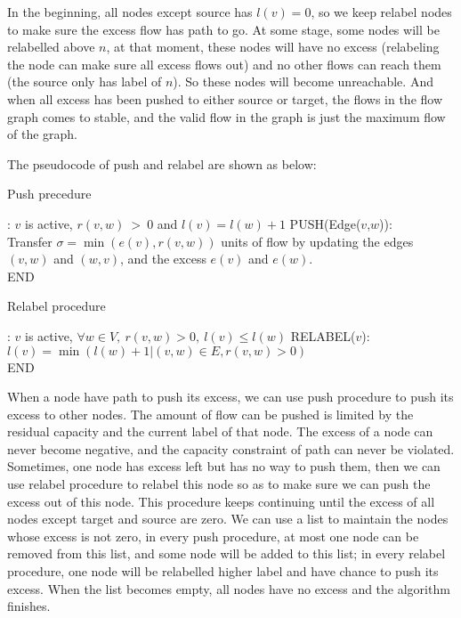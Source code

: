 \documentclass[twocolumn,9pt]{extarticle}
\begin{document}
In the beginning, all nodes except source has $l(v)=0$, so we keep relabel nodes to make sure the excess flow has path to go. At some stage, some nodes will be relabelled above $n$, at that moment, these nodes will have no excess (relabeling the node can make sure all excess flows out) and no other flows can reach them (the source only has label of $n$). So these nodes will become unreachable. And when all excess has been pushed to either source or target, the flows in the flow graph comes to stable, and the valid flow in the graph is just the maximum flow of the graph.

The pseudocode of push and relabel are shown as below:
\begin{algorithm}
\caption{Push precedure}
	\begin{algorithmic}[1]
		\Require: $v$ is active, $r(v,w)\ >\ 0$ and $l(v)=l(w)+1$
		PUSH(Edge($v$,$w$)):\\
			Transfer $\sigma=\min(e(v),r(v,w))$ units of flow by updating the edges $(v,w)$ and $(w,v)$, and the excess $e(v)$ and $e(w)$.\\
		END
	\end{algorithmic}
\end{algorithm}

\begin{algorithm}
\caption{Relabel procedure}
	\begin{algorithmic}[1]
		\Require: $v$ is active, $\forall w \in V,\ r(v,w) > 0,\ l(v) \le l(w)$
		RELABEL($v$):\\
		$l(v) = \min(l(w)+1 | (v,w) \in E, r(v,w)>0)$\\
		END
	\end{algorithmic}
\end{algorithm}

When a node have path to push its excess, we can use push procedure to push its excess to other nodes. The amount of flow can be pushed is limited by the residual capacity and the current label of that node. The excess of a node can never become negative, and the capacity constraint of path can never be violated. Sometimes, one node has excess left but has no way to push them, then we can use relabel procedure to relabel this node so as to make sure we can push the excess out of this node. This procedure keeps continuing until the excess of all nodes except target and source are zero. We can use a list to maintain the nodes whose excess is not zero, in every push procedure, at most one node can be removed from this list, and some node will be added to this list; in every relabel procedure, one node will be relabelled higher label and have chance to push its excess. When the list becomes empty, all nodes have no excess and the algorithm finishes.
\end{document}
